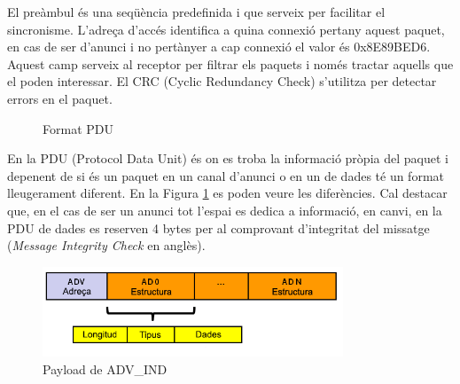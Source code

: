 El preàmbul és una seqüència predefinida i que serveix per facilitar el sincronisme.
L'adreça d'accés identifica a quina connexió pertany aquest paquet, en cas de ser d'anunci i no pertànyer a cap connexió el valor és 0x8E89BED6.
Aquest camp serveix al receptor per filtrar els paquets i només tractar aquells que el poden interessar.
El CRC (Cyclic Redundancy Check) s'utilitza per detectar errors en el paquet. 

\begin{figure}[!h]
	\begin{center}
		\begin{subfigmatrix}{1}
		\end{subfigmatrix}
	\end{center}
	\caption{Format PDU}
	\label{fig:pdu_format}
\end{figure}

En la PDU (Protocol Data Unit) és on es troba la informació pròpia del paquet i depenent de si és un paquet en un canal d'anunci o en un de dades té un format lleugerament diferent.
En la Figura \ref{fig:pdu_format} es poden veure les diferències.
Cal destacar que, en el cas de ser un anunci tot l'espai es dedica a informació, en canvi, en la PDU de dades es reserven 4 bytes per al comprovant d'integritat del missatge (\textit{Message Integrity Check} en anglès).

\begin{figure}[!h]
	\begin{center}
		\includegraphics[width=0.8\textwidth]{./images/adv-ind-packet.png}
		\caption{Payload de ADV\_IND \cite{BLE_4.2_packet_format}}
	\end{center}
\end{figure}

